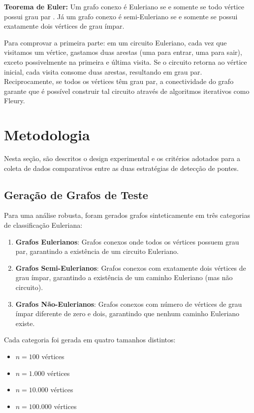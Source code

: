 \documentclass{sbc2023}%
\begin{document}
\textbf{Teorema de Euler:} Um grafo conexo é Euleriano se e somente se todo vértice possui grau par \cite{diestel:2017}. Já um grafo conexo é semi-Euleriano se e somente se possui exatamente dois vértices de grau ímpar.

Para comprovar a primeira parte: em um circuito Euleriano, cada vez que visitamos um vértice, gastamos duas arestas (uma para entrar, uma para sair), exceto possivelmente na primeira e última visita. Se o circuito retorna ao vértice inicial, cada visita consome duas arestas, resultando em grau par. Reciprocamente, se todos os vértices têm grau par, a conectividade do grafo garante que é possível construir tal circuito através de algoritmos iterativos como Fleury.

\section{Metodologia}

Nesta seção, são descritos o design experimental e os critérios adotados para a coleta de dados comparativos entre as duas estratégias de detecção de pontes.

\subsection{Geração de Grafos de Teste}

Para uma análise robusta, foram gerados grafos sinteticamente em três categorias de classificação Euleriana:

\begin{enumerate}
    \item \textbf{Grafos Eulerianos}: Grafos conexos onde todos os vértices possuem grau par, garantindo a existência de um circuito Euleriano.
    
    \item \textbf{Grafos Semi-Eulerianos}: Grafos conexos com exatamente dois vértices de grau ímpar, garantindo a existência de um caminho Euleriano (mas não circuito).
    
    \item \textbf{Grafos Não-Eulerianos}: Grafos conexos com número de vértices de grau ímpar diferente de zero e dois, garantindo que nenhum caminho Euleriano existe.
\end{enumerate}

Cada categoria foi gerada em quatro tamanhos distintos:
\begin{itemize}
    \item $n = 100$ vértices
    \item $n = 1.000$ vértices
    \item $n = 10.000$ vértices
    \item $n = 100.000$ vértices
\end{itemize}
\end{document}
